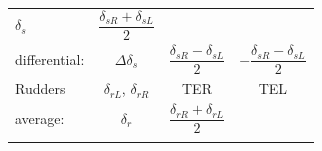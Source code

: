\documentclass[
]{book}
\begin{document}
\begin{longtable}[]{@{}lccc@{}}
\begin{minipage}[t]{0.14\columnwidth}
\(\delta_{s}\)\strut
\end{minipage} & \begin{minipage}[t]{0.29\columnwidth}\centering
\[\frac{\delta_{sR}+\delta_{sL}}{2}\]\strut
\end{minipage} & \begin{minipage}[t]{0.27\columnwidth}\centering
\strut
\end{minipage}\tabularnewline
\begin{minipage}[t]{0.19\columnwidth}\raggedright
differential:\strut
\end{minipage} & \begin{minipage}[t]{0.14\columnwidth}\centering
\(\Delta\delta_{s}\)\strut
\end{minipage} & \begin{minipage}[t]{0.29\columnwidth}\centering
\[\frac{\delta_{sR} - \delta_{sL}}{2}\]\strut
\end{minipage} & \begin{minipage}[t]{0.27\columnwidth}\centering
\[-\frac{\delta_{sR} - \delta_{sL}}{2}\]\strut
\end{minipage}\tabularnewline
\begin{minipage}[t]{0.19\columnwidth}\raggedright
Rudders\strut
\end{minipage} & \begin{minipage}[t]{0.14\columnwidth}\centering
\(\delta_{rL}\),
\(\delta_{rR}\)\strut
\end{minipage} & \begin{minipage}[t]{0.29\columnwidth}\centering
TER\strut
\end{minipage} & \begin{minipage}[t]{0.27\columnwidth}\centering
TEL\strut
\end{minipage}\tabularnewline
\begin{minipage}[t]{0.19\columnwidth}\raggedright
average:\strut
\end{minipage} & \begin{minipage}[t]{0.14\columnwidth}\centering
\(\delta_{r}\)\strut
\end{minipage} & \begin{minipage}[t]{0.29\columnwidth}\centering
\[\frac{\delta_{rR}+\delta_{rL}}{2}\]\strut
\end{minipage} & \begin{minipage}[t]{0.27\columnwidth}\centering
\strut
\end{minipage}\tabularnewline
\begin{minipage}[t]{0.19\columnwidth}\raggedright

\end{minipage}
\end{longtable}
\end{document}
